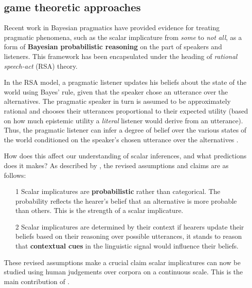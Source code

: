 \documentclass[10pt, biblatex, linguex]{report}
\begin{document}
\subsection{game theoretic approaches}

Recent work in Bayesian pragmatics \citep{frank_predicting_2012,
lassiter_context_2013, rothschild2013game, goodman_pragmatic_2016} have provided
evidence for treating pragmatic phenomena, such as the scalar implicature from
\textit{some} to \textit{not all}, as a form of \textbf{Bayesian probabilistic
reasoning} on the part of speakers and listeners. This framework has been
encapsulated under the heading of \textit{rational speech-act} (RSA) theory.

In the RSA model, a pragmatic listener updates his beliefs about the state of
the world using Bayes' rule, given that the speaker chose an utterance over the
alternatives. The pragmatic speaker in turn is assumed to be approximately
rational and chooses their utterances proportional to their expected utility
(based on how much epistemic utility a \textit{literal} listener would derive
from an utterance). Thus, the pragmatic listener can infer a degree of belief
over the various states of the world conditioned on the speaker's chosen
utterance over the alternatives \citep{goodman_knowledge_2013,goodman_pragmatic_2016}.

How does this affect our understanding of scalar inferences, and what predictions
does it makes? As described by \citeauthor{degen_investigating_2015}, the
revised assumptions and claims are as follows:

\begin{enumerate}
    \item[1] Scalar implicatures are \textbf{probabilistic} rather than
             categorical. The probability reflects the hearer's belief that
             an alternative is more probable than others. This is the strength
             of a scalar implicature.
    \item[2] Scalar implicatures are determined by their context \dash if
             hearers update their beliefs based on their reasoning over
             possible utterances, it stands to reason that \textbf{contextual cues}
             in the linguistic signal would influence their beliefs.
\end{enumerate}

These revised assumptions make a crucial claim \dash scalar implicatures can
now be studied using human judgements over corpora on a continuous scale. This
is the main contribution of \citet{degen_investigating_2015}.
\end{document}
